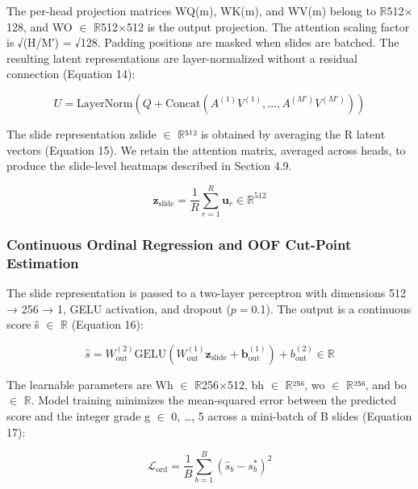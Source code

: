 \documentclass[11pt,a4paper]{article}
\begin{document}
The per-head projection matrices WQ(m), WK(m), and WV(m) belong to $\mathbb{R}$512$\times$128, and WO $\in$ $\mathbb{R}$512$\times$512 is the output projection. The attention scaling factor is √(H/M′) = √128. Padding positions are masked when slides are batched. The resulting latent representations are layer-normalized without a residual connection (Equation 14):


\begin{equation}
U = \text{LayerNorm}\left(Q + \text{Concat}\left(A^{(1)} V^{(1)}, \dots, A^{(M')} V^{(M')}\right)\right)
\label{eq:lra_norm}
\end{equation}

The slide representation zslide $\in$ $\mathbb{R}$⁵¹² is obtained by averaging the R latent vectors (Equation 15). We retain the attention matrix, averaged across heads, to produce the slide-level heatmaps described in Section 4.9.


\begin{equation}
\mathbf{z}_{\text{slide}} = \frac{1}{R} \sum_{r=1}^R \mathbf{u}_r \in \mathbb{R}^{512}
\label{eq:slide_emb}
\end{equation}


\subsubsection{Continuous Ordinal Regression and OOF Cut-Point Estimation}
The slide representation is passed to a two-layer perceptron with dimensions 512 → 256 → 1, GELU activation, and dropout ($p = 0.$1). The output is a continuous score ŝ $\in$ $\mathbb{R}$ (Equation 16):


\begin{equation}
\hat{s} = W_{\text{out}}^{(2)} \text{GELU}\left(W_{\text{out}}^{(1)} \mathbf{z}_{\text{slide}} + \mathbf{b}_{\text{out}}^{(1)}\right) + b_{\text{out}}^{(2)} \in \mathbb{R}
\label{eq:mlp}
\end{equation}

The learnable parameters are Wh $\in$ $\mathbb{R}$256$\times$512, bh $\in$ $\mathbb{R}$²⁵⁶, wo $\in$ $\mathbb{R}$²⁵⁶, and bo $\in$ $\mathbb{R}$. Model training minimizes the mean-squared error between the predicted score and the integer grade g $\in$ {0, …, 5} across a mini-batch of B slides (Equation 17):


\begin{equation}
\mathcal{L}_{\text{ord}} = \frac{1}{B} \sum_{b=1}^B (\hat{s}_b - s_b^*)^2
\label{eq:loss}
\end{equation}
\end{document}
